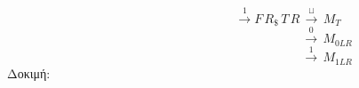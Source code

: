 \reducevspace\reducevspace\reducevspace\reducevspace\reducevspace\reducevspace\reducevspace\reducevspace\reducevspace
\reducevspace\reducevspace\reducevspace\reducevspace\reducevspace\reducevspace\reducevspace\reducevspace\reducevspace
\reducevspace\reducevspace\reducevspace\reducevspace\reducevspace\reducevspace\reducevspace\reducevspace\reducevspace
\reducevspace\reducevspace\reducevspace\reducevspace\reducevspace\reducevspace\reducevspace\reducevspace\reducevspace
\[\qquad\qquad\qquad\qquad\quad\, \xrightarrow{1} F\, R_\$\, T\, R\, \xrightarrow{\sqcup}\, M_T
\]
\reducevspace\reducevspace\reducevspace\reducevspace\reducevspace\reducevspace\reducevspace
\reducevspace\reducevspace\reducevspace\reducevspace\reducevspace\reducevspace\reducevspace
\reducevspace\reducevspace\reducevspace\reducevspace\reducevspace\reducevspace\reducevspace
\reducevspace\reducevspace\reducevspace\reducevspace\reducevspace\reducevspace\reducevspace
\[\qquad\qquad\qquad\qquad\qquad\qquad\qquad\quad\;\, \xrightarrow{0}\, M_{0LR}\]
\reducevspace\reducevspace\reducevspace\reducevspace\reducevspace\reducevspace\reducevspace
\reducevspace\reducevspace\reducevspace\reducevspace\reducevspace\reducevspace\reducevspace
\reducevspace\reducevspace\reducevspace\reducevspace\reducevspace\reducevspace\reducevspace
\reducevspace\reducevspace\reducevspace\reducevspace\reducevspace\reducevspace\reducevspace
\[\qquad\qquad\qquad\qquad\qquad\qquad\qquad\quad\;\, \xrightarrow{1}\, M_{1LR}\]
\reducevspace\reducevspace\reducevspace\reducevspace\reducevspace\reducevspace\reducevspace
\reducevspace\reducevspace\reducevspace\reducevspace\reducevspace\reducevspace\reducevspace
\reducevspace\reducevspace\reducevspace\reducevspace\reducevspace\reducevspace\reducevspace
Δοκιμή:
\reducevspace\reducevspace\reducevspace\reducevspace\reducevspace\reducevspace\reducevspace\reducevspace\reducevspace
